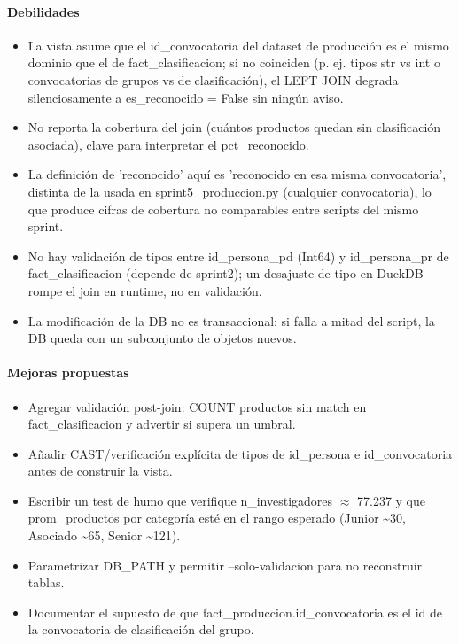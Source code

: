 \paragraph{Debilidades}
\begin{itemize}
  \item La vista asume que el id\_convocatoria del dataset de producción es el mismo dominio que el de fact\_clasificacion; si no coinciden (p. ej. tipos str vs int o convocatorias de grupos vs de clasificación), el LEFT JOIN degrada silenciosamente a es\_reconocido = False sin ningún aviso.
  \item No reporta la cobertura del join (cuántos productos quedan sin clasificación asociada), clave para interpretar el pct\_reconocido.
  \item La definición de 'reconocido' aquí es 'reconocido en esa misma convocatoria', distinta de la usada en sprint5\_produccion.py (cualquier convocatoria), lo que produce cifras de cobertura no comparables entre scripts del mismo sprint.
  \item No hay validación de tipos entre id\_persona\_pd (Int64) y id\_persona\_pr de fact\_clasificacion (depende de sprint2); un desajuste de tipo en DuckDB rompe el join en runtime, no en validación.
  \item La modificación de la DB no es transaccional: si falla a mitad del script, la DB queda con un subconjunto de objetos nuevos.
\end{itemize}

\paragraph{Mejoras propuestas}
\begin{itemize}
  \item Agregar validación post-join: COUNT productos sin match en fact\_clasificacion y advertir si supera un umbral.
  \item Añadir CAST/verificación explícita de tipos de id\_persona e id\_convocatoria antes de construir la vista.
  \item Escribir un test de humo que verifique n\_investigadores $\approx$ 77.237 y que prom\_productos por categoría esté en el rango esperado (Junior \textasciitilde{}30, Asociado \textasciitilde{}65, Senior \textasciitilde{}121).
  \item Parametrizar DB\_PATH y permitir --solo-validacion para no reconstruir tablas.
  \item Documentar el supuesto de que fact\_produccion.id\_convocatoria es el id de la convocatoria de clasificación del grupo.
\end{itemize}

